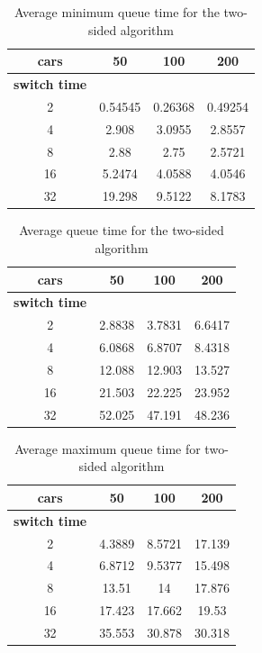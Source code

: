 \documentclass[a4paper,11pt]{article}
\begin{document}
\begin{table}[htb]
\centering
\begin{tabular}{cccc}
\hline
\textbf{cars} & 50 & 100 & 200\\
\hline
\textbf{switch time} & & & \\
2 & 0.54545 & 0.26368 & 0.49254 \\
4 & 2.908 & 3.0955 & 2.8557 \\
8 & 2.88 & 2.75 & 2.5721 \\
16 & 5.2474 & 4.0588 & 4.0546 \\
32 & 19.298 & 9.5122 & 8.1783 \\
\hline
\end{tabular}
\caption{Average minimum queue time for the two-sided algorithm}
\end{table}

\begin{table}[htb]
\centering
\begin{tabular}{cccc}
\hline
\textbf{cars} & 50 & 100 & 200\\
\hline
\textbf{switch time} & & & \\
2 & 2.8838 & 3.7831 & 6.6417 \\
4 & 6.0868 & 6.8707 & 8.4318 \\
8 & 12.088 & 12.903 & 13.527 \\
16 & 21.503 & 22.225 & 23.952 \\
32 & 52.025 & 47.191 & 48.236 \\
\hline
\end{tabular}
\caption{Average queue time for the two-sided algorithm}
\end{table}

\begin{table}[htb]
\centering
\begin{tabular}{cccc}
\hline
\textbf{cars} & 50 & 100 & 200\\
\hline
\textbf{switch time} & & & \\
2 & 4.3889 & 8.5721 & 17.139 \\
4 & 6.8712 & 9.5377 & 15.498 \\
8 & 13.51 & 14 & 17.876 \\
16 & 17.423 & 17.662 & 19.53 \\
32 & 35.553 & 30.878 & 30.318 \\
\hline
\end{tabular}
\caption{Average maximum queue time for two-sided algorithm}
\end{table}
\end{document}
